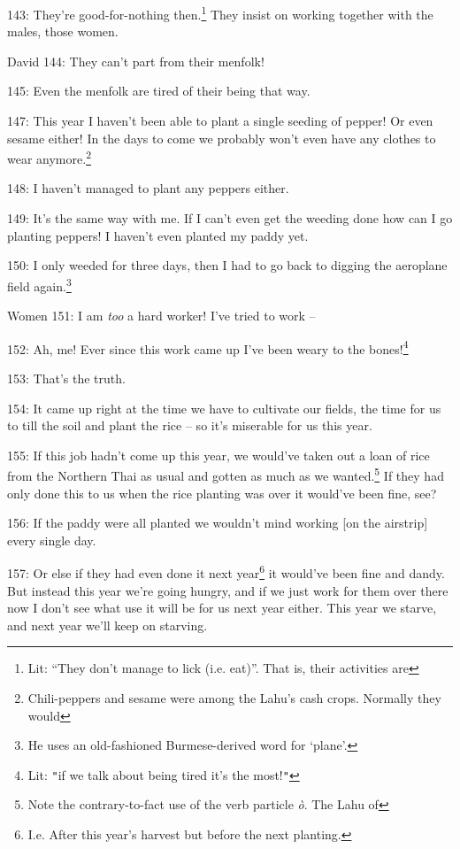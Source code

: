 143: They're good-for-nothing then.\footnote{Lit: ``They don't manage to lick (i.e. eat)''. That is, their activities are} They insist on working together with the
males, those women.

David 144: They can't part from their menfolk!

145: Even the menfolk are tired of their being that way.

147: This year I haven't been able to plant a single seeding of pepper! Or even
sesame either! In the days to come we probably won't even have any clothes to wear
anymore.\footnote{Chili-peppers and sesame were among the Lahu's cash crops. Normally they would}

148: I haven't managed to plant any peppers either.

149: It's the same way with me. If I can't even get the weeding done how can I
go planting peppers! I haven't even planted my paddy yet.

150: I only weeded for three days, then I had to go back to digging the aeroplane
field again.\footnote{He uses an old-fashioned Burmese-derived word for `plane'.}

Women 151: I am \textit{too} a hard worker! I've tried to work --

152: Ah, me! Ever since this work came up I've been weary to the bones!\footnote{Lit: \texttt{"}if we talk about being tired it's the most!\texttt{"}}

153: That's the truth.

154: It came up right at the time we have to cultivate our fields, the time for
us to till the soil and plant the rice -- so it's miserable for us this year.

155: If this job hadn't come up this year, we would've taken out a loan of rice
from the Northern Thai as usual and gotten as much as we wanted.\footnote{Note the contrary-to-fact use of the verb particle \textit{ò}. The Lahu of} If they had
only done this to us when the rice planting was over it would've been fine, see?

156: If the paddy were all planted we wouldn't mind working [on the airstrip] every
single day.

157: Or else if they had even done it next year\footnote{I.e. After this year's harvest but before the next planting.} it would've been fine and dandy.
But instead this year we're going hungry, and if we just work for them over there
now I don't see what use it will be for us next year either. This year we starve,
and next year we'll keep on starving.

